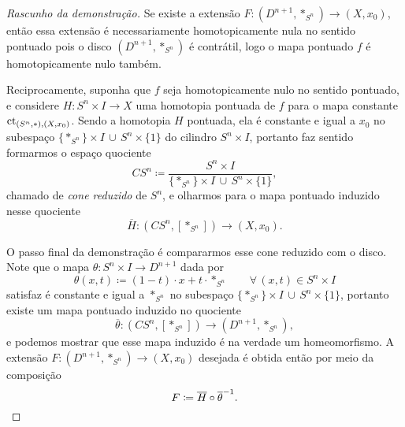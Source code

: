 \begin{proof}[Rascunho da demonstração]
  Se existe a extensão $F: (D^{n+1},*_{S^{n}}) \to (X,x_{0})$, então essa extensão é necessariamente homotopicamente nula no sentido pontuado pois o disco $(D^{n+1},*_{S^{n}})$ é contrátil, logo o mapa pontuado $f$ é homotopicamente nulo também.

  Reciprocamente, suponha que $f$ seja homotopicamente nulo no sentido pontuado, e considere $H: S^{n} \times I \to X$ uma homotopia pontuada de $f$ para o mapa constante $\mathrm{ct}_{(S^{n},*),(X,x_{0})}$.
  Sendo a homotopia $H$ pontuada, ela é constante e igual a $x_{0}$ no subespaço $\{*_{S^{n}}\} \times I \, \cup \, S^{n} \times \{1\}$ do cilindro $S^{n} \times I$, portanto faz sentido formarmos o espaço quociente
  \begin{displaymath}
    CS^{n} \coloneqq \frac{S^{n} \times I}{\{*_{S^{n}}\} \times I \, \cup \, S^{n} \times \{1\}},
  \end{displaymath}
  chamado de \emph{cone reduzido} de $S^{n}$, e olharmos para o mapa pontuado induzido nesse quociente
  \begin{displaymath}
    \overline{H}: (CS^{n},[*_{S^{n}}]) \to (X,x_{0}).
  \end{displaymath}

  O passo final da demonstração é compararmos esse cone reduzido com o disco.
  Note que o mapa $\theta: S^{n} \times I \to D^{n+1}$ dada por
  \begin{displaymath}
    \theta(x,t) \coloneqq (1-t) \cdot x + t \cdot *_{S^{n}} \qquad \forall\, (x,t) \in S^{n} \times I
  \end{displaymath}
  satisfaz é constante e igual a $*_{S^{n}}$ no subespaço $\{*_{S^{n}}\} \times I \, \cup \, S^{n} \times \{1\}$, portanto existe um mapa pontuado induzido no quociente
  \begin{displaymath}
    \overline{\theta}: (CS^{n},[*_{S^{n}}]) \to (D^{n+1},*_{S^{n}}),
  \end{displaymath}
  e podemos mostrar que esse mapa induzido é na verdade um homeomorfismo.
  A extensão $F: (D^{n+1},*_{S^{n}}) \to (X,x_{0})$ desejada é obtida então por meio da composição
  \begin{displaymath}
    F \coloneqq \overline{H} \circ \overline{\theta}^{-1}. \qedhere
  \end{displaymath}
\end{proof}

